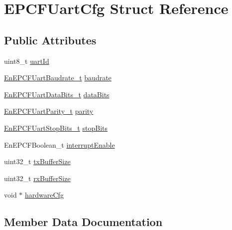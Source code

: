 \hypertarget{structEPCFUartCfg}{}\section{E\+P\+C\+F\+Uart\+Cfg Struct Reference}
\label{structEPCFUartCfg}
\subsection*{Public Attributes}
\begin{DoxyCompactItemize}
\item 
uint8\+\_\+t \mbox{\hyperlink{structEPCFUartCfg_a7fcc9c804313cbc8f01af381ea28a840}{uart\+Id}}
\item 
\mbox{\hyperlink{uart_8h_a24fb18401ffd9130c23a2cfe3bce15ad}{En\+E\+P\+C\+F\+Uart\+Baudrate\+\_\+t}} \mbox{\hyperlink{structEPCFUartCfg_a40222f034578279705cdf4057c945ea5}{baudrate}}
\item 
\mbox{\hyperlink{uart_8h_a516fed66490995cacbaac89afadb3faf}{En\+E\+P\+C\+F\+Uart\+Data\+Bits\+\_\+t}} \mbox{\hyperlink{structEPCFUartCfg_a04a5e975552aa93fbf5ee1142c994498}{data\+Bits}}
\item 
\mbox{\hyperlink{uart_8h_ae3b1989d517831580e94d943b5701848}{En\+E\+P\+C\+F\+Uart\+Parity\+\_\+t}} \mbox{\hyperlink{structEPCFUartCfg_a9bca630da923c86a472569120bcaf0c0}{parity}}
\item 
\mbox{\hyperlink{uart_8h_a1d89bd0bb4e330d2d1d8b0229ecbcb35}{En\+E\+P\+C\+F\+Uart\+Stop\+Bits\+\_\+t}} \mbox{\hyperlink{structEPCFUartCfg_a73d09fb0d0a1c9bed2168744e0f395f1}{stop\+Bits}}
\item 
En\+E\+P\+C\+F\+Boolean\+\_\+t \mbox{\hyperlink{structEPCFUartCfg_a46be619c0ace09e5f81dc82923693556}{interrupt\+Enable}}
\item 
uint32\+\_\+t \mbox{\hyperlink{structEPCFUartCfg_adc64f8ba1a6f531727518641fd220737}{tx\+Buffer\+Size}}
\item 
uint32\+\_\+t \mbox{\hyperlink{structEPCFUartCfg_a18b2a5f72dcf93e14987a0dc5d9c74b1}{rx\+Buffer\+Size}}
\item 
void $\ast$ \mbox{\hyperlink{structEPCFUartCfg_adb1ead8cb827ec9e7c9ebe52d777e6a0}{hardware\+Cfg}}
\end{DoxyCompactItemize}


\subsection{Member Data Documentation}
\mbox{\label{structEPCFUartCfg_a40222f034578279705cdf4057c945ea5}} 
